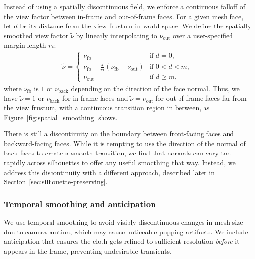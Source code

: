 \documentclass[10pt,journal,compsoc,twoside]{TexInputs/IEEEtran}
\begin{document}
Instead of using a spatially discontinuous field, we enforce a continuous falloff of
the view factor between in-frame and out-of-frame faces. For a given mesh face,
let $d$ be its distance from the view frustum in world space. We define the
spatially smoothed view factor $\tilde\nu$ by linearly interpolating to $\nu_{\text{out}}$ over a user-specified margin length $m$:
\begin{align}
  \tilde\nu = \begin{cases}
    \nu_{\text{fb}} & \text{if $d = 0$}, \\
    \nu_{\text{fb}} - \frac dm(\nu_{\text{fb}} - \nu_{\text{out}}) & \text{if $0 < d < m$}, \\
    \nu_{\text{out}} & \text{if $d \ge m$},
  \end{cases}
\end{align}
where $\nu_{\text{fb}}$ is $1$ or $\nu_{\text{back}}$ depending on the direction of the face normal.
Thus, we have $\tilde\nu = 1$ or $\nu_{\text{back}}$ for in-frame faces and $\tilde\nu =
\nu_{\text{out}}$ for out-of-frame faces far from the view frustum, with a continuous transition region in between, as Figure~\ref{fig:spatial_smoothing} shows.

There is still a discontinuity on the boundary between front-facing faces
and backward-facing faces. While it is tempting to use the direction of the
normal of back-faces to create a smooth transition, we find that normals can vary too
rapidly across silhouettes to offer any useful smoothing that way. Instead, we
address this discontinuity with a different approach, described later in
Section~\ref{sec:silhouette-preserving}.

\subsubsection{Temporal smoothing and anticipation} 

We use temporal smoothing to avoid visibly discontinuous changes in mesh size due to camera motion, which
may cause noticeable popping artifacts. We include anticipation that ensures the
cloth gets refined to sufficient resolution \emph{before} it appears in the
frame, preventing undesirable transients.

\end{document}
